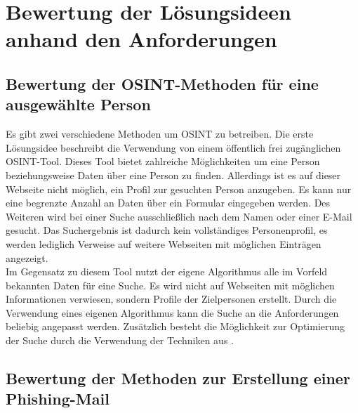 

\chapter{Bewertung der Lösungsideen anhand den Anforderungen}  %
\label{cha:BewertungLösungsideenAnhandAnforderung} %

\section{Bewertung der OSINT-Methoden für eine ausgewählte Person}
Es gibt zwei verschiedene Methoden um OSINT zu betreiben. Die erste Lösungsidee beschreibt die Verwendung von einem öffentlich frei zugänglichen OSINT-Tool. Dieses Tool bietet zahlreiche Möglichkeiten um eine Person beziehungsweise Daten über eine Person zu finden. Allerdings ist es auf dieser Webseite nicht möglich, ein Profil zur gesuchten Person anzugeben. Es kann nur eine begrenzte Anzahl an Daten über ein Formular eingegeben werden. Des Weiteren wird bei einer Suche ausschließlich nach dem Namen oder einer E-Mail gesucht. Das Suchergebnis ist dadurch kein vollständiges Personenprofil, es werden lediglich Verweise auf weitere Webseiten mit möglichen Einträgen angezeigt.\\
Im Gegensatz zu diesem Tool nutzt der eigene Algorithmus alle im Vorfeld bekannten Daten für eine Suche. Es wird nicht auf Webseiten mit möglichen Informationen verwiesen, sondern Profile der Zielpersonen erstellt. Durch die Verwendung eines eigenen Algorithmus kann die Suche an die Anforderungen beliebig angepasst werden. Zusätzlich besteht die Möglichkeit zur Optimierung der Suche durch die Verwendung der Techniken aus \cite{Bazzell}.
\section{Bewertung der Methoden zur Erstellung einer Phishing-Mail}
